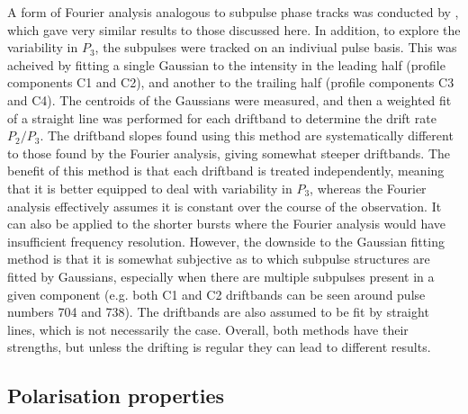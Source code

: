 A form of Fourier analysis analogous to subpulse phase tracks was conducted by \citet{ZLH+2019}, which gave very similar results to those discussed here. In addition, to explore the variability in $P_3$, the subpulses were tracked on an indiviual pulse basis. This was acheived by fitting a single Gaussian to the intensity in the leading half (profile components C1 and C2), and another to the trailing half (profile components C3 and C4). The centroids of the Gaussians were measured, and then a weighted fit of a straight line was performed for each driftband to determine the drift rate $P_2/P_3$. The driftband slopes found using this method are systematically different to those found by the Fourier analysis, giving somewhat steeper driftbands. The benefit of this method is that each driftband is treated independently, meaning that it is better equipped to deal with variability in $P_3$, whereas the Fourier analysis effectively assumes it is constant over the course of the observation. It can also be applied to the shorter bursts where the Fourier analysis would have insufficient frequency resolution. However, the downside to the Gaussian fitting method is that it is somewhat subjective as to which subpulse structures are fitted by Gaussians, especially when there are multiple subpulses present in a given component (e.g. both C1 and C2 driftbands can be seen around pulse numbers 704 and 738). The driftbands are also assumed to be fit by straight lines, which is not necessarily the case. Overall, both methods have their strengths, but unless the drifting is regular they can lead to different results.











\subsection{Polarisation properties}
\label{sec: J1926 - analysis - polarisation}

